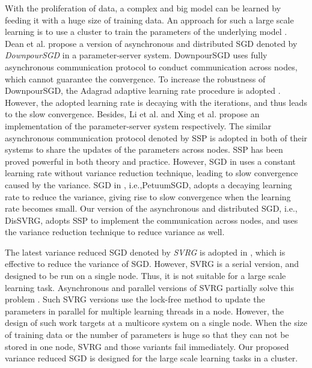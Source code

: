 \documentclass[preprint,review,11pt,a4paper]{elsarticle}
\begin{document}
With the proliferation of data, a complex and big model can be learned by feeding it with a huge size of training data. An approach for such a large scale learning is to use a cluster to train the parameters of the underlying model \cite{Dean:2012wx, Li:2014tt, Xing:2015ib}. Dean et al. propose a version of asynchronous and distributed SGD denoted by \emph{DownpourSGD} in a parameter-server system. DownpourSGD uses fully asynchronous communication protocol to conduct communication across nodes, which cannot guarantee the convergence. To increase the robustness of DownpourSGD, the Adagrad adaptive learning rate procedure is adopted \cite{Cavalcante:2009il}. However, the adopted learning rate is decaying with the iterations, and thus leads to the slow convergence. Besides, Li et al. and Xing et al. propose an implementation of the parameter-server system respectively.  The similar asynchronous communication protocol denoted by SSP is adopted in both of their systems to share the updates of the parameters across nodes. SSP has been proved powerful in both theory and practice.  However, SGD in \cite{Li:2014tt} uses a constant learning rate without variance reduction technique, leading to slow convergence caused by the variance. SGD in \cite{Xing:2015ib}, i.e.,PetuumSGD, adopts a decaying learning rate to reduce the variance, giving rise to slow convergence when the learning rate becomes small. Our version of the asynchronous and distributed SGD, i.e., DisSVRG, adopts SSP to implement the communication across nodes, and uses the variance reduction technique  to reduce variance as well.

The latest variance reduced SGD denoted by \emph{SVRG} is adopted in \cite{Johnson:9MAvkbgy}, which is  effective to reduce the variance of SGD. However, SVRG is a serial version, and designed to be run on a single node. Thus, it is not suitable for a large scale learning task. Asynchronous and parallel versions of SVRG partially solve this problem \cite{Zhao:SZfxEHHg, Reddi:2015vj, Mania:2015wa, lian2015asynchronous}. Such SVRG versions use the lock-free method to update the parameters in parallel for multiple learning threads in a node. However, the design of such work targets at a multicore system on a single node. When the size of training data or the number of parameters  is huge so that they can not be stored in one node, SVRG and those variants fail immediately. Our proposed variance reduced SGD is designed for  the large scale learning tasks in a cluster.
\end{document}
